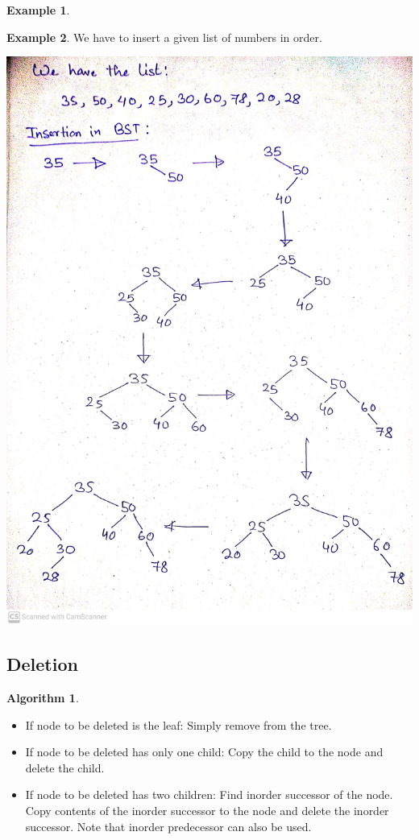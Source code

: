 \documentclass[10pt, a4paper]{extarticle}
\theoremstyle{definition}
\newtheorem{alg}{Algorithm}
\newtheorem{eg}{Example}
\begin{document}
\begin{eg}
\begin{center}
		\end{center}
	\end{eg}

	\begin{eg}
		We have to insert a given list of numbers in order.
		\begin{center}
			\includegraphics[scale=0.1]{bst4.jpg}\\
		\end{center}
	\end{eg}
	\subsection{Deletion}
	\begin{alg}\hfill
		\begin{itemize}
			\item If node to be deleted is the leaf: Simply remove from the tree. 
			\item If node to be deleted has only one child: Copy the child to the node and delete the child.
			\item If node to be deleted has two children: Find inorder successor of the node. Copy contents of the inorder successor to the node and delete the inorder successor. Note that inorder predecessor can also be used. 
		\end{itemize}
	\end{alg}
\end{document}
